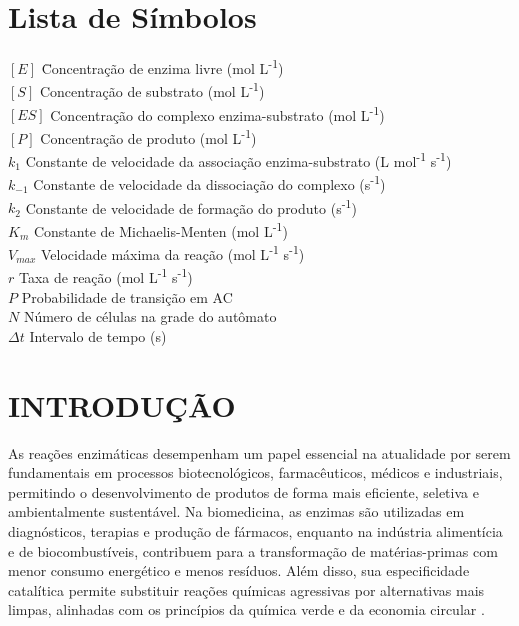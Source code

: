 \documentclass[12pt,oneside]{report}
\begin{document}
\chapter*{Lista de Símbolos}
\begin{tabbing}
    $[E]$ \hspace{2cm} \= Concentração de enzima livre (mol L\textsuperscript{-1}) \\
    $[S]$ \> Concentração de substrato (mol L\textsuperscript{-1}) \\
    $[ES]$ \> Concentração do complexo enzima-substrato (mol L\textsuperscript{-1}) \\
    $[P]$ \> Concentração de produto (mol L\textsuperscript{-1}) \\
    $k_1$ \> Constante de velocidade da associação enzima-substrato (L mol\textsuperscript{-1} s\textsuperscript{-1}) \\
    $k_{-1}$ \> Constante de velocidade da dissociação do complexo (s\textsuperscript{-1}) \\
    $k_2$ \> Constante de velocidade de formação do produto (s\textsuperscript{-1}) \\
    $K_m$ \> Constante de Michaelis-Menten (mol L\textsuperscript{-1}) \\
    $V_{max}$ \> Velocidade máxima da reação (mol L\textsuperscript{-1} s\textsuperscript{-1}) \\
    $r$ \> Taxa de reação (mol L\textsuperscript{-1} s\textsuperscript{-1}) \\
    $P$ \> Probabilidade de transição em AC \\
    $N$ \> Número de células na grade do autômato \\
    $\Delta t$ \> Intervalo de tempo (s) \\
\end{tabbing}

\newpage

\tableofcontents
\newpage

\setcounter{page}{1}

\chapter{INTRODUÇÃO}

As reações enzimáticas desempenham um papel essencial na atualidade por serem fundamentais em processos biotecnológicos, farmacêuticos, médicos e industriais, permitindo o desenvolvimento de produtos de forma mais eficiente, seletiva e ambientalmente sustentável. Na biomedicina, as enzimas são utilizadas em diagnósticos, terapias e produção de fármacos, enquanto na indústria alimentícia e de biocombustíveis, contribuem para a transformação de matérias-primas com menor consumo energético e menos resíduos. Além disso, sua especificidade catalítica permite substituir reações químicas agressivas por alternativas mais limpas, alinhadas com os princípios da química verde e da economia circular \cite{nelson2018}.
\end{document}
